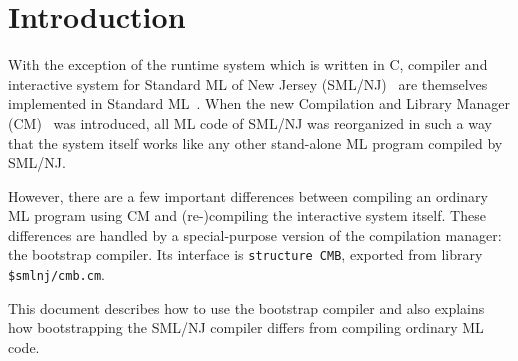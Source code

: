 
\section{Introduction}

With the exception of the runtime system which is written in C,
compiler and interactive system for Standard ML of New Jersey
(SML/NJ)~\cite{appel91:sml} are themselves implemented in Standard
ML~\cite{milner97}.  When the new Compilation and Library Manager
(CM)~\cite{blume00:newcm} was introduced, all ML code of SML/NJ was
reorganized in such a way that the system itself works like any other
stand-alone ML program compiled by SML/NJ.

However, there are a few important differences between compiling an
ordinary ML program using CM and (re-)compiling the interactive system
itself.  These differences are handled by a special-purpose version of
the compilation manager: the bootstrap compiler.  Its interface is
{\tt structure CMB}, exported from library {\tt \$smlnj/cmb.cm}.

This document describes how to use the bootstrap compiler and also
explains how bootstrapping the SML/NJ compiler differs from compiling
ordinary ML code.
